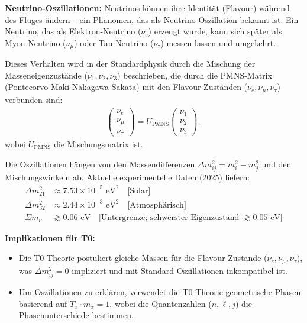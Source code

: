 	\begin{important}
		\textbf{Neutrino-Oszillationen:} Neutrinos können ihre Identität (Flavour) während des Fluges ändern – ein Phänomen, das als Neutrino-Oszillation bekannt ist. Ein Neutrino, das als Elektron-Neutrino (\(\nu_e\)) erzeugt wurde, kann sich später als Myon-Neutrino (\(\nu_\mu\)) oder Tau-Neutrino (\(\nu_\tau\)) messen lassen und umgekehrt.
		
		Dieses Verhalten wird in der Standardphysik durch die Mischung der Masseneigenzustände (\(\nu_1, \nu_2, \nu_3\)) beschrieben, die durch die PMNS-Matrix (Pontecorvo-Maki-Nakagawa-Sakata) mit den Flavour-Zuständen (\(\nu_e, \nu_\mu, \nu_\tau\)) verbunden sind:
		\begin{align}
			\begin{pmatrix}
				\nu_e \\ \nu_\mu \\ \nu_\tau
			\end{pmatrix}
			=
			U_{\text{PMNS}}
			\begin{pmatrix}
				\nu_1 \\ \nu_2 \\ \nu_3
			\end{pmatrix},
		\end{align}
		wobei \(U_{\text{PMNS}}\) die Mischungsmatrix ist.
		
		Die Oszillationen hängen von den Massendifferenzen \(\Delta m^2_{ij} = m_i^2 - m_j^2\) und den Mischungswinkeln ab. Aktuelle experimentelle Daten (2025) liefern:
		\begin{align}
			\Delta m^2_{21} &\approx 7.53 \times 10^{-5} \text{ eV}^2 \quad \text{[Solar]} \\
			\Delta m^2_{32} &\approx 2.44 \times 10^{-3} \text{ eV}^2 \quad \text{[Atmosphärisch]} \\
			\Sigma m_\nu &\gtrsim 0.06 \text{ eV} \quad \text{[Untergrenze; schwerster Eigenzustand } \gtrsim 0.05\text{ eV]}
		\end{align}

		\textbf{Implikationen für T0:}
		\begin{itemize}
			\item Die T0-Theorie postuliert gleiche Massen für die Flavour-Zustände (\(\nu_e, \nu_\mu, \nu_\tau\)), was \(\Delta m^2_{ij} = 0\) impliziert und mit Standard-Oszillationen inkompatibel ist.
			\item Um Oszillationen zu erklären, verwendet die T0-Theorie geometrische Phasen basierend auf \( T_x \cdot m_x = 1 \), wobei die Quantenzahlen (\(n, \ell, j\)) die Phasenunterschiede bestimmen.
		\end{itemize}
	\end{important}
	
